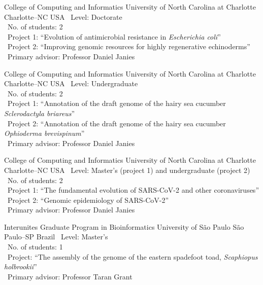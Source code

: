 \documentclass[11pt, letterpaper, sans]{moderncv}
\begin{document}
{College of Computing and Informatics}
{University of North Carolina at Charlotte}
{Charlotte--NC}
{USA}
{
	\textbullet~Level: Doctorate\\
	\textbullet~No. of students: 2\\
	\textbullet~Project 1: ``Evolution of antimicrobial resistance in \textit{Escherichia coli}''\\
	\textbullet~Project 2: ``Improving genomic resources for highly regenerative echinoderms''\\
	\textbullet~Primary advisor: Professor Daniel Janies\\
}

{College of Computing and Informatics}
{University of North Carolina at Charlotte}
{Charlotte--NC}
{USA}
{
	\textbullet~Level: Undergraduate\\
	\textbullet~No. of students: 2\\
	\textbullet~Project 1: ``Annotation of the draft genome of the hairy sea cucumber \textit{Sclerodactyla briareus}''\\
	\textbullet~Project 2: ``Annotation of the draft genome of the hairy sea cucumber \textit{Ophioderma brevispinum}''\\
	\textbullet~Primary advisor: Professor Daniel Janies\\
}

{College of Computing and Informatics}
{University of North Carolina at Charlotte}
{Charlotte--NC}
{USA}
{
	\textbullet~Level: Master's (project 1) and undergraduate (project 2)\\
	\textbullet~No. of students: 2\\
	\textbullet~Project 1: ``The  fundamental evolution of SARS-CoV-2 and other coronaviruses''\\
	\textbullet~Project 2: ``Genomic epidemiology of SARS-CoV-2''\\
	\textbullet~Primary advisor: Professor Daniel Janies\\
}

{Interunites Graduate Program in Bioinformatics}
{University of São Paulo}
{São Paulo--SP}
{Brazil}
{
	\textbullet~Level: Master's\\
	\textbullet~No. of students: 1\\
	\textbullet~Project: ``The assembly of the genome of the eastern spadefoot toad, \emph{Scaphiopus holbrookii}''\\
	\textbullet~Primary advisor: Professor Taran Grant\\
}
\end{document}
